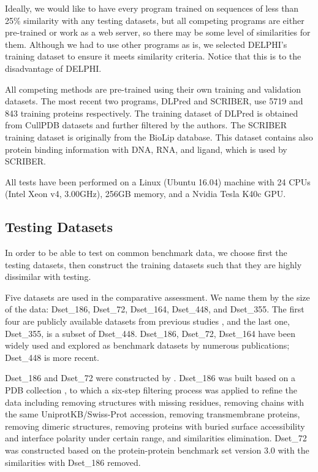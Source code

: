 Ideally, we would like to have every program trained on sequences of less than 25\% similarity with any testing datasets, but all competing programs are either pre-trained or work as a web server, so there may be some level of similarities for them. Although we had to use other programs as is, we selected DELPHI's training dataset to ensure it meets similarity criteria. Notice that this is to the disadvantage of DELPHI.

All competing methods are pre-trained using their own training and validation datasets. The most recent two programs, DLPred and SCRIBER, use 5719 and 843 training proteins respectively. The training dataset of DLPred is obtained from CullPDB datasets \cite{wang2003pisces} and further filtered by the authors. The SCRIBER training dataset is originally from the BioLip database. This dataset contains also protein binding information with DNA, RNA, and ligand, which is used by SCRIBER.

All tests have been performed on a Linux (Ubuntu 16.04) machine with 24 CPUs (Intel Xeon v4, 3.00GHz), 256GB memory, and a Nvidia Tesla K40c GPU.
\subsection{Testing Datasets \label{testing_data}}
In order to be able to test on common benchmark data, we choose first the testing datasets, then construct the training datasets such that they are highly dissimilar with testing.

Five datasets are used in the comparative assessment. We name them by the size of the data: Dset\_186, Dset\_72, Dset\_164, Dset\_448, and Dset\_355. The first four are publicly available datasets from previous studies \cite{murakami2010applying} \cite{dhole2014sequence} \cite{zhang2019scriber}, and the last one, Dset\_355, is a subset of Dset\_448. Dset\_186, Dset\_72, Dset\_164 have been widely used and explored as benchmark datasets by numerous publications; Dset\_448 is more recent.

Dset\_186 and Dset\_72 were constructed by \cite{murakami2010applying}. Dset\_186 was built based on a PDB collection \cite{berman2002protein}, to which a six-step filtering process was applied to refine the data including removing structures with missing residues, removing chains with the same UniprotKB/Swiss-Prot accession, removing transmembrane proteins, removing dimeric structures, removing proteins with buried surface accessibility and interface polarity under certain range, and similarities elimination. Dset\_72 was constructed based on the protein-protein benchmark set version 3.0 \cite{hwang2008protein} with the similarities with Dset\_186 removed.

